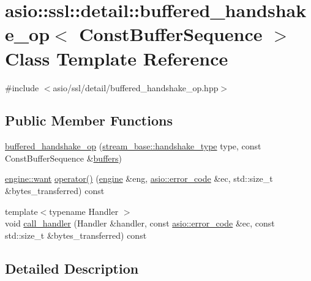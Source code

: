 \hypertarget{classasio_1_1ssl_1_1detail_1_1buffered__handshake__op}{}\section{asio\+:\+:ssl\+:\+:detail\+:\+:buffered\+\_\+handshake\+\_\+op$<$ Const\+Buffer\+Sequence $>$ Class Template Reference}
\label{classasio_1_1ssl_1_1detail_1_1buffered__handshake__op}


{\ttfamily \#include $<$asio/ssl/detail/buffered\+\_\+handshake\+\_\+op.\+hpp$>$}

\subsection*{Public Member Functions}
\begin{DoxyCompactItemize}
\item 
\hyperlink{classasio_1_1ssl_1_1detail_1_1buffered__handshake__op_ae835b9479c097d829bebad90a6ae130f}{buffered\+\_\+handshake\+\_\+op} (\hyperlink{classasio_1_1ssl_1_1stream__base_a2f18813d3860bc8aee99249834d7c320}{stream\+\_\+base\+::handshake\+\_\+type} type, const Const\+Buffer\+Sequence \&\hyperlink{group__async__read_ga54dede45c3175148a77fe6635222c47d}{buffers})
\item 
\hyperlink{classasio_1_1ssl_1_1detail_1_1engine_ab9812153941a6a93c9095f4e5ca8f915}{engine\+::want} \hyperlink{classasio_1_1ssl_1_1detail_1_1buffered__handshake__op_af2df0903bf007cd13b16f1cc6238edd6}{operator()} (\hyperlink{classasio_1_1ssl_1_1detail_1_1engine}{engine} \&eng, \hyperlink{classasio_1_1error__code}{asio\+::error\+\_\+code} \&ec, std\+::size\+\_\+t \&bytes\+\_\+transferred) const 
\item 
{\footnotesize template$<$typename Handler $>$ }\\void \hyperlink{classasio_1_1ssl_1_1detail_1_1buffered__handshake__op_ae92797920b5264265725521e08cc746b}{call\+\_\+handler} (Handler \&handler, const \hyperlink{classasio_1_1error__code}{asio\+::error\+\_\+code} \&ec, const std\+::size\+\_\+t \&bytes\+\_\+transferred) const 
\end{DoxyCompactItemize}


\subsection{Detailed Description}
